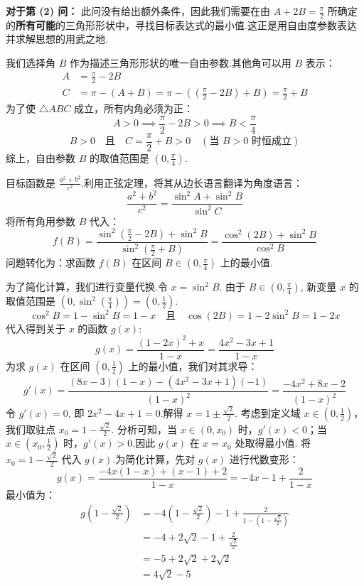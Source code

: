 \begin{prob-sol}
\textbf{对于第 (2) 问：}
此问没有给出额外条件，因此我们需要在由 $A+2B=\frac{\pi}{2}$ 所确定的\textbf{所有可能}的三角形形状中，寻找目标表达式的最小值.这正是用自由度参数表达并求解思想的用武之地.

我们选择角 $B$ 作为描述三角形形状的唯一自由参数.其他角可以用 $B$ 表示：
\begin{align*}
	A &= \frac{\pi}{2}-2B \\
	C &= \pi - (A+B) = \pi - \left(\left(\frac{\pi}{2}-2B\right)+B\right) = \frac{\pi}{2}+B
\end{align*}
为了使 $\triangle ABC$ 成立，所有内角必须为正：
\[
A > 0 \implies \frac{\pi}{2}-2B > 0 \implies B < \frac{\pi}{4}
\]
\[
B > 0 \quad \text{且} \quad C = \frac{\pi}{2}+B > 0 \quad (\text{当 } B>0 \text{ 时恒成立})
\]
综上，自由参数 $B$ 的取值范围是 $(0, \frac{\pi}{4})$.

目标函数是 $\frac{a^2+b^2}{c^2}$.利用正弦定理，将其从边长语言翻译为角度语言：
\[
\frac{a^2+b^2}{c^2} = \frac{\sin^2 A + \sin^2 B}{\sin^2 C}
\]
将所有角用参数 $B$ 代入：
\[
f(B) = \frac{\sin^2(\frac{\pi}{2}-2B) + \sin^2 B}{\sin^2(\frac{\pi}{2}+B)} = \frac{\cos^2(2B) + \sin^2 B}{\cos^2 B}
\]
问题转化为：求函数 $f(B)$ 在区间 $B \in (0, \frac{\pi}{4})$ 上的最小值.

为了简化计算，我们进行变量代换.令 $x = \sin^2 B$.
由于 $B \in (0, \frac{\pi}{4})$, 新变量 $x$ 的取值范围是 $(0, \sin^2(\frac{\pi}{4})) = (0, \frac{1}{2})$.
\[
\cos^2 B = 1-\sin^2 B = 1-x \quad \text{且} \quad \cos(2B) = 1-2\sin^2 B = 1-2x
\]
代入得到关于 $x$ 的函数 $g(x)$:
\[
g(x) = \frac{(1-2x)^2+x}{1-x} = \frac{4x^2-3x+1}{1-x}
\]
为求 $g(x)$ 在区间 $(0, \frac{1}{2})$ 上的最小值，我们对其求导：
\[
g'(x) = \frac{(8x-3)(1-x) - (4x^2-3x+1)(-1)}{(1-x)^2} = \frac{-4x^2+8x-2}{(1-x)^2}
\]
令 $g'(x)=0$, 即 $2x^2-4x+1 = 0$.解得 $x = 1 \pm \frac{\sqrt{2}}{2}$.
考虑到定义域 $x \in (0, \frac{1}{2})$，我们取驻点 $x_0 = 1 - \frac{\sqrt{2}}{2}$.
分析可知，当 $x \in (0, x_0)$ 时，$g'(x)<0$；当 $x \in (x_0, \frac{1}{2})$ 时，$g'(x)>0$.因此 $g(x)$ 在 $x=x_0$ 处取得最小值.
将 $x_0 = 1 - \frac{\sqrt{2}}{2}$ 代入 $g(x)$.为简化计算，先对 $g(x)$ 进行代数变形：
\[
g(x) = \frac{-4x(1-x)+(x-1)+2}{1-x} = -4x-1+\frac{2}{1-x}
\]
最小值为：
\begin{align*}
	g\left(1 - \frac{\sqrt{2}}{2}\right) &= -4\left(1-\frac{\sqrt{2}}{2}\right) - 1 + \frac{2}{1-\left(1-\frac{\sqrt{2}}{2}\right)} \\
	&= -4 + 2\sqrt{2} - 1 + \frac{2}{\frac{\sqrt{2}}{2}} \\
	&= -5 + 2\sqrt{2} + 2\sqrt{2} \\
	&= 4\sqrt{2}-5
\end{align*}\hfill\qedsymbol
\end{prob-sol}
